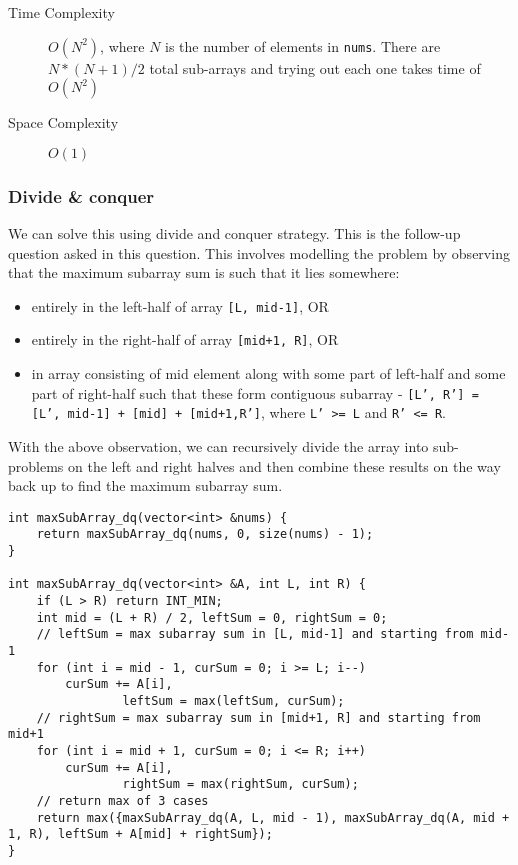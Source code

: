 \documentclass[11pt]{article}
\begin{document}
\begin{description}
\item[{Time Complexity}] \(O(N^2)\), where \(N\) is the number of elements in \texttt{nums}. There are \(N*(N+1)/2\) total sub-arrays and trying out each one takes time of \(O(N^2)\)
\item[{Space Complexity}] \(O(1)\)
\end{description}

\subsubsection{Divide \& conquer}
\label{sec:orgbdbecdb}
We can solve this using divide and conquer strategy. This is the follow-up question asked in this question. This involves modelling the problem by observing that the maximum subarray sum is such that it lies somewhere:
\begin{itemize}
\item entirely in the left-half of array \texttt{[L, mid-1]}, OR
\item entirely in the right-half of array \texttt{[mid+1, R]}, OR
\item in array consisting of mid element along with some part of left-half and some part of right-half such that these form contiguous subarray - \texttt{[L', R'] = [L', mid-1] + [mid] + [mid+1,R']}, where \texttt{L' >= L} and \texttt{R' <= R}.
\end{itemize}

With the above observation, we can recursively divide the array into sub-problems on the left and right halves and then combine these results on the way back up to find the maximum subarray sum.


\begin{verbatim}
int maxSubArray_dq(vector<int> &nums) {
    return maxSubArray_dq(nums, 0, size(nums) - 1);
}

int maxSubArray_dq(vector<int> &A, int L, int R) {
    if (L > R) return INT_MIN;
    int mid = (L + R) / 2, leftSum = 0, rightSum = 0;
    // leftSum = max subarray sum in [L, mid-1] and starting from mid-1
    for (int i = mid - 1, curSum = 0; i >= L; i--)
        curSum += A[i],
                leftSum = max(leftSum, curSum);
    // rightSum = max subarray sum in [mid+1, R] and starting from mid+1
    for (int i = mid + 1, curSum = 0; i <= R; i++)
        curSum += A[i],
                rightSum = max(rightSum, curSum);
    // return max of 3 cases
    return max({maxSubArray_dq(A, L, mid - 1), maxSubArray_dq(A, mid + 1, R), leftSum + A[mid] + rightSum});
}
\end{verbatim}
\end{document}
